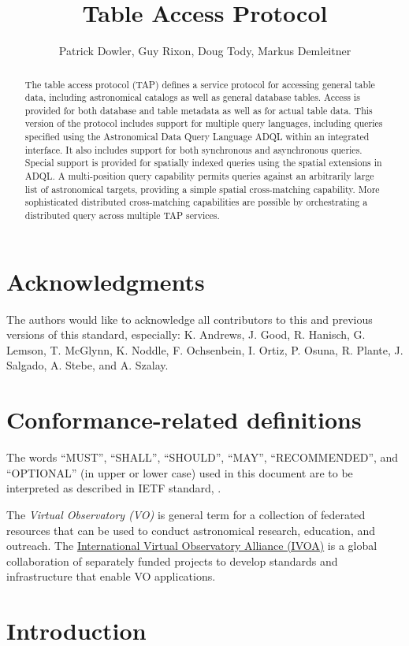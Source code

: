 \documentclass[11pt,letter]{ivoa}
\title{Table Access Protocol}
\author{Patrick Dowler, Guy Rixon, Doug Tody, Markus Demleitner}
\begin{document}
\begin{abstract}
The table access protocol (TAP) defines a service protocol for accessing general 
table data, including astronomical catalogs as well as general database tables. 
Access is provided for both database and table metadata as well as for actual 
table data. This version of the protocol includes support for multiple query 
languages, including queries specified using the Astronomical Data Query 
Language ADQL  within an integrated interface. It also includes 
support 
for both synchronous and asynchronous queries. Special support is provided for
spatially indexed queries using the spatial extensions in ADQL. A multi-position 
query capability permits queries against an arbitrarily large list of 
astronomical targets, providing a simple spatial cross-matching capability. 
More sophisticated distributed cross-matching capabilities are possible by 
orchestrating a distributed query across multiple TAP services.  
\end{abstract}


\section*{Acknowledgments}

The authors would like to acknowledge all contributors to this and previous 
versions of this standard, especially: K. Andrews, J. Good, R. Hanisch, G. 
Lemson, T. McGlynn, K. Noddle, F. Ochsenbein, I. Ortiz, P. Osuna, R. Plante, 
J. Salgado, A. Stebe, and A. Szalay.


\section*{Conformance-related definitions}

The words ``MUST'', ``SHALL'', ``SHOULD'', ``MAY'', ``RECOMMENDED'', and
``OPTIONAL'' (in upper or lower case) used in this document are to be
interpreted as described in IETF standard, \citet{std:RFC2119}.

The \emph{Virtual Observatory (VO)} is general term for a collection of 
federated resources that can be used to conduct astronomical research, 
education, and outreach. The \href{http://www.ivoa.net}{International
Virtual Observatory Alliance (IVOA)} is a global collaboration of separately 
funded projects to develop standards and infrastructure that enable VO 
applications.


\section{Introduction}
\label{sec:Introduction}
\end{document}
